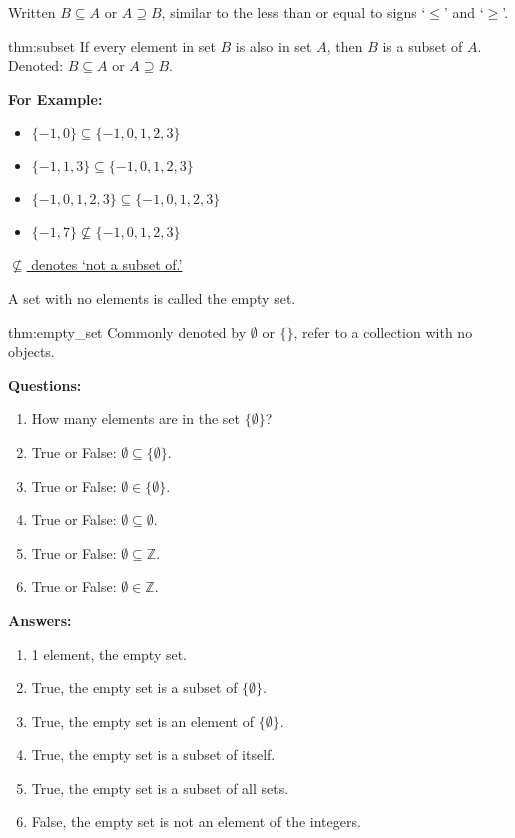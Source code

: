 \noindent
Written $B \subseteq A$ or $A \supseteq B$, similar to the less than or
equal to signs `$\leq$' and `$\geq$'.

\begin{theo}[Subset]{thm:subset}
    If every element in set $B$ is also in set $A$, then $B$ is a subset of $A$.\\
    Denoted: $B \subseteq A$ or $A \supseteq B$.
\end{theo}

\noindent
\textbf{For Example:}
\begin{itemize}
    \item $\{-1, 0\} \subseteq \{-1, 0, 1, 2, 3\}$
    \item $\{-1, 1, 3\} \subseteq \{-1, 0, 1, 2, 3\}$
    \item $\{-1, 0, 1, 2, 3\} \subseteq \{-1, 0, 1, 2, 3\}$
    \item $\{-1, 7\} \not\subseteq \{-1, 0, 1, 2, 3\}$
\end{itemize}

\underline{$\not\subseteq$ denotes `not a subset of.'}

\vspace{1em}
\noindent
A set with no elements is called the empty set.
\begin{theo}{thm:empty_set}
    Commonly denoted by $\emptyset$ or $\{\}$, refer to a collection with no objects.
\end{theo}

\noindent
\textbf{Questions:}
\begin{enumerate}
    \item How many elements are in the set  $\{\emptyset\}$?
    \item True or False: $\emptyset \subseteq \{\emptyset\}$.
    \item True or False: $\emptyset \in \{\emptyset\}$.
    \item True or False: $\emptyset \subseteq \emptyset$.
    \item True or False: $\emptyset \subseteq \mathbb{Z}$.
    \item True or False: $\emptyset \in \mathbb{Z}$.
\end{enumerate}

\noindent
\textbf{Answers:}
\begin{enumerate}
    \item 1 element, the empty set.
    \item True, the empty set is a subset of $\{\emptyset\}$.
    \item True, the empty set is an element of $\{\emptyset\}$.
    \item True, the empty set is a subset of itself.
    \item True, the empty set is a subset of all sets.
    \item False, the empty set is not an element of the integers.
\end{enumerate}


